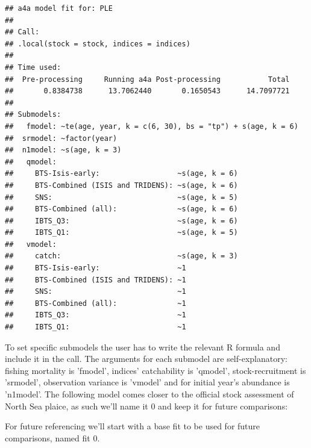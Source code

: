\documentclass[a4paper,english,11pt]{article}
\begin{document}
\begin{knitrout}
\color{fgcolor}\begin{kframe}
\begin{alltt}
\end{alltt}
\begin{verbatim}
## a4a model fit for: PLE 
## 
## Call:
## .local(stock = stock, indices = indices)
## 
## Time used:
##  Pre-processing     Running a4a Post-processing           Total 
##       0.8384738      13.7062440       0.1650543      14.7097721 
## 
## Submodels:
## 	 fmodel: ~te(age, year, k = c(6, 30), bs = "tp") + s(age, k = 6)
## 	srmodel: ~factor(year)
## 	n1model: ~s(age, k = 3)
## 	 qmodel:
## 	   BTS-Isis-early:                  ~s(age, k = 6)
## 	   BTS-Combined (ISIS and TRIDENS): ~s(age, k = 6)
## 	   SNS:                             ~s(age, k = 5)
## 	   BTS-Combined (all):              ~s(age, k = 6)
## 	   IBTS_Q3:                         ~s(age, k = 6)
## 	   IBTS_Q1:                         ~s(age, k = 5)
## 	 vmodel:
## 	   catch:                           ~s(age, k = 3)
## 	   BTS-Isis-early:                  ~1
## 	   BTS-Combined (ISIS and TRIDENS): ~1
## 	   SNS:                             ~1
## 	   BTS-Combined (all):              ~1
## 	   IBTS_Q3:                         ~1
## 	   IBTS_Q1:                         ~1
\end{verbatim}
\end{kframe}
\end{knitrout}

To set specific submodels the user has to write the relevant R formula and include it in the call. The arguments for each submodel are self-explanatory: fishing mortality is 'fmodel', indices' catchability is 'qmodel', stock-recruitment is 'srmodel', observation variance is 'vmodel' and for initial year's abundance is 'n1model'. The following model comes closer to the official stock assessment of North Sea plaice, as such we'll name it $0$ and keep it for future comparisons:


For future referencing we'll start with a base fit to be used for future comparisons, named fit 0.
\end{document}
